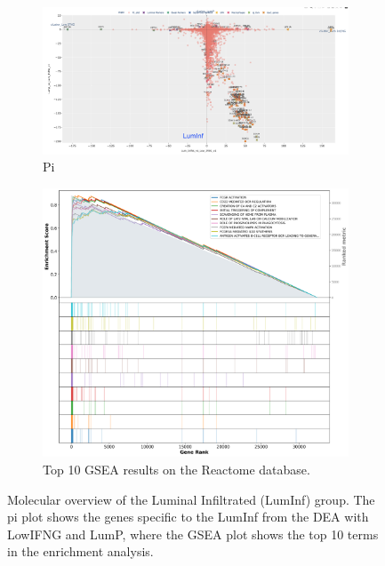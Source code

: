 \begin{figure}[!htb]
    \centering
    \begin{subfigure}[!t]{0.79\textwidth}
        \includegraphics[width=\textwidth,keepaspectratio]{Sections/ClusteringAnalysis/Resources/discussion/other_groups/lumInf_pi.png}    
        \caption{Pi}
        \label{fig:cs:lumInf_pi}
    \end{subfigure}
    \centering
    \begin{subfigure}[!t]{0.69\textwidth}
        \includegraphics[width=\textwidth, keepaspectratio]{Sections/ClusteringAnalysis/Resources/discussion/other_groups/lumInf_reactome_10_top.png}
        \caption{Top 10 GSEA results on the Reactome database.}
        \label{fig:cs:lumInf_gsea}
    \end{subfigure} 
    \centering
    \caption{Molecular overview of the Luminal Infiltrated (LumInf) group. The pi plot shows the genes specific to the LumInf from the DEA with LowIFNG and LumP, where the GSEA plot shows the top 10 terms in the enrichment analysis.} 
    \label{fig:cs:lumInf}
\end{figure}


